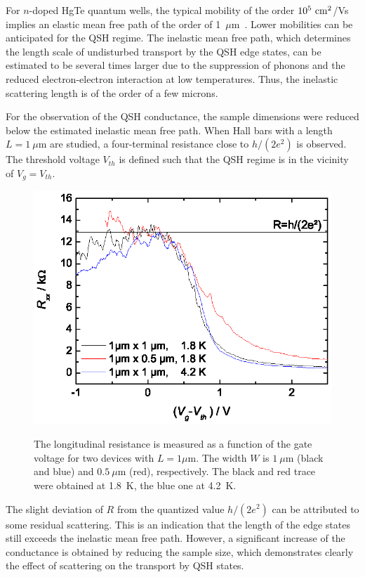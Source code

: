 \documentclass{article}
\begin{document}
For $n$-doped HgTe quantum wells, the typical mobility of the order
$10^5~{\rm cm}^2$/Vs implies an elastic mean free path of the order
of 1~$\mu$m~\cite{Daumer03}. Lower mobilities can be anticipated for
the QSH regime. The inelastic mean free path, which determines the
length scale of undisturbed transport by the QSH edge states, can be
estimated to be several times larger due to the suppression of
phonons and the reduced electron-electron interaction at low
temperatures. Thus, the inelastic scattering length is of the order
of a few microns.

For the observation of the QSH conductance, the sample dimensions
were reduced below the estimated inelastic mean free path. When
Hall bars with a length $L=1~\mu$m are studied, a four-terminal
resistance close to $h/(2e^2)$ is observed. The threshold voltage
$V_{th}$ is defined such that the QSH regime is in the vicinity of
$V_g=V_{th}$.
\begin{figure}[htb]
\centering
 \includegraphics[width=0.8\linewidth]{80608Fig14.eps}\\
 \caption{The longitudinal resistance is measured as a function of
 the gate voltage for two devices with $L=1\mu$m. The width $W$ is
 $1~\mu$m (black and blue) and $0.5~\mu$m (red), respectively. The black
 and red trace were obtained at 1.8~K, the blue one at 4.2~K.}
 \label{FigQSHEquant}
\end{figure}
The slight deviation of $R$ from the quantized value $h/(2e^2)$ can
be attributed to some residual scattering. This is an indication
that the length of the edge states still exceeds the inelastic mean
free path. However, a significant increase of the conductance is
obtained by reducing the sample size, which demonstrates clearly the
effect of scattering on the transport by QSH states.
\end{document}
